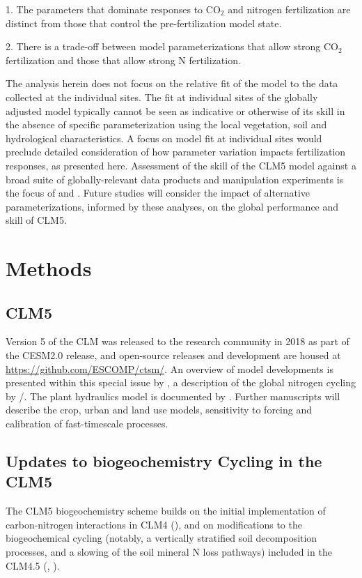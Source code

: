 \documentclass[draft,linenumbers]{agujournal}
\begin{document}
1. The parameters that dominate responses to CO$_{2}$ and nitrogen fertilization are distinct from those that control the pre-fertilization model state.

2. There is a trade-off between model parameterizations that allow strong CO$_{2}$ fertilization and those that allow strong N fertilization. 

The analysis herein does not focus on the relative fit of the model to the data collected at the individual sites. The fit at individual sites of the globally adjusted model typically cannot be seen as indicative or otherwise of its skill in the absence of specific parameterization using the local vegetation, soil and hydrological characteristics. A focus on model fit at individual sites would preclude detailed consideration of how parameter variation impacts fertilization responses, as presented here. Assessment of the skill of the CLM5 model against a broad suite of globally-relevant data products and manipulation experiments is the focus of \cite{lawrence2018} and \cite{wieder2019}. Future studies will consider the impact of alternative parameterizations, informed by these analyses, on the global performance and skill of CLM5.

\section{Methods}

\subsection{CLM5}
 Version 5 of the CLM was released to the research community in 2018 as part of the CESM2.0 release, and open-source releases and development are housed at \url{https://github.com/ESCOMP/ctsm/}. An overview of model developments is presented within this special issue by \cite{lawrence2018}, a description of the global nitrogen cycling by \cite{wieder2019}/. The plant hydraulics model is documented by \cite{kennedy2019}. Further manuscripts will describe the crop, urban and land use models, sensitivity to forcing and calibration of fast-timescale processes.
 
\subsection{Updates to biogeochemistry Cycling in the CLM5}
The CLM5 biogeochemistry scheme builds on the initial implementation of carbon-nitrogen interactions in CLM4 (\cite{thornton2007}),  and on modifications to the biogeochemical cycling (notably, a vertically stratified soil decomposition processes, and a slowing of the soil mineral N loss pathways) included in the CLM4.5 (\cite{koven2013}, \cite{bonan2012}). 
\end{document}
